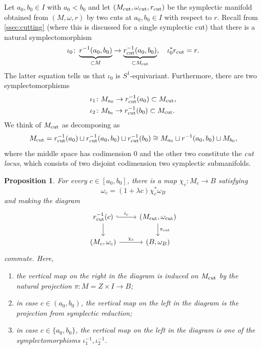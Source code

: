 \documentclass[10pt,oneside,reqno]{amsart}
\newtheorem{proposition}[theorem]{Proposition}
\theoremstyle{definition}
\newcommand{\cut}{\textup{cut}}
\begin{document}
Let $a_0, b_0 \in I$ with $a_0 < b_0$ and let $(M_\cut,\omega_\cut,r_\cut)$ be the symplectic manifold obtained from $(M, \omega,r)$ by two cuts at $a_0,b_0\in I$ with respect to $r$. Recall from \cref{ssec:cutting} (where this is discussed for a single symplectic cut) that there is a natural symplectomorphism
\begin{equation*}
    \iota_0 \colon \underbrace{r^{-1}(a_0,b_0)}_{\subset M} \rightarrow \underbrace{r_\cut^{-1}(a_0,b_0)}_{\subset M_\cut}, \quad
    \iota_0^* r_\cut = r.
\end{equation*} 
The latter equation tells us that $\iota_0$ is $S^1$-equivariant. Furthermore, there are two symplectomorphisms 
\begin{align*}
    &\iota_1 \colon M_{a_0} \rightarrow r^{-1}_\cut(a_0) \subset M_{\cut}, \\
    &\iota_2 \colon M_{b_0} \rightarrow r^{-1}_\cut(b_0) \subset M_{\cut}.
\end{align*}
We think of $M_\cut$ as decomposing as
\begin{equation*}
    M_\cut 
    = r_\cut^{-1}(a_0) \sqcup r_\cut^{-1}(a_0,b_0) \sqcup r_\cut^{-1}(b_0)
    \cong M_{a_0} \sqcup r^{-1}(a_0,b_0) \sqcup M_{b_0},
\end{equation*}
where the middle space has codimension $0$ and the other two constitute the \emph{cut locus}, which consists of two disjoint codimension two symplectic submanifolds. 

\begin{proposition}
    For every $c \in [a_0,b_0]$, there is a map $\chi_c \colon M_c \rightarrow B$ satisfying
    \begin{equation*}
        \omega_c = (1+\lambda c)\chi_c^* \omega_B
    \end{equation*}
    and making the diagram
    \begin{equation*}
    \begin{tikzcd}
        r_\cut^{-1}(c) \arrow[d] \arrow[r, "i_c", hook] & {(M_\cut,\omega_\cut)} \arrow[d, "\pi_\cut"] \\
        {(M_c,\omega_c)} \arrow[r, "\chi_c"]                                & {(B,\omega_B)}                                
    \end{tikzcd}
    \end{equation*}
    commute. Here, 
    \begin{enumerate}
        \item the vertical map on the right in the diagram is induced on $M_\cut$ by the natural projection $\pi \colon M = Z \times I \rightarrow B$;
        \item in case $c \in (a_0,b_0)$, the vertical map on the left in the diagram is the projection from symplectic reduction;
        \item in case $c \in \{a_0,b_0\}$, the vertical map on the left in the diagram is one of the symplectomorphisms $\iota_1^{-1}, \iota_2^{-1}$. 
    \end{enumerate}
\end{proposition}
\end{document}
